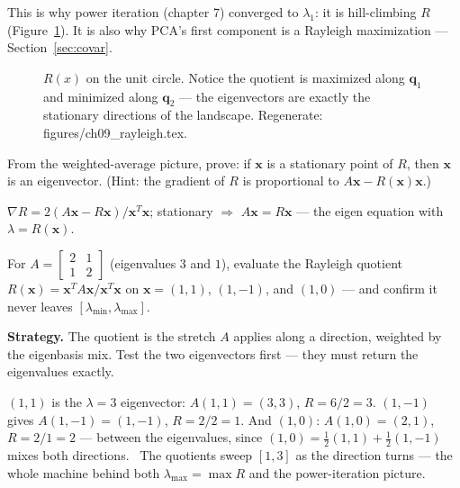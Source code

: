 This is why power iteration (chapter 7) converged to $\lambda_1$: it is
hill-climbing $R$ (Figure~\ref{fig:rayleigh}). It is also why PCA's first
component is a Rayleigh maximization --- Section~\ref{sec:covar}.

\begin{figure}[htbp]
\centering

\caption{$R(x)$ on the unit circle. Notice the quotient is maximized
along $\mathbf q_1$ and minimized along $\mathbf q_2$ --- the
eigenvectors are exactly the stationary directions of the landscape.
Regenerate: \ttfamily figures/ch09\_rayleigh.tex.}
\label{fig:rayleigh}
\end{figure}

\begin{exercise}[hard]
From the weighted-average picture, prove: if $\mathbf x$ is a stationary
point of $R$, then $\mathbf x$ is an eigenvector. (Hint: the gradient of
$R$ is proportional to $A\mathbf x-R(\mathbf x)\mathbf x$.)
\begin{solution}
$\nabla R=2(A\mathbf x-R\mathbf x)/\mathbf x^{T}\mathbf x$; stationary
$\Rightarrow$ $A\mathbf x=R\mathbf x$ --- the eigen equation with
$\lambda=R(\mathbf x)$.
\end{solution}
\end{exercise}

\begin{example}\label{ex:rayq}
For $A=\begin{bmatrix}2&1\\1&2\end{bmatrix}$ (eigenvalues $3$ and $1$),
evaluate the Rayleigh quotient
$R(\mathbf{x})=\mathbf{x}^{T}A\mathbf{x}/\mathbf{x}^{T}\mathbf{x}$ on
$\mathbf{x}=(1,1)$, $(1,-1)$, and $(1,0)$ --- and confirm it never
leaves $[\lambda_{\min},\lambda_{\max}]$.
\par\smallskip
\textbf{Strategy.} The quotient is the stretch $A$ applies along a
direction, weighted by the eigenbasis mix. Test the two eigenvectors
first --- they must return the eigenvalues exactly.
\begin{solution}
$(1,1)$ is the $\lambda=3$ eigenvector: $A(1,1)=(3,3)$,
$R=6/2=3$. $(1,-1)$ gives $A(1,-1)=(1,-1)$, $R=2/2=1$. And
$(1,0)$: $A(1,0)=(2,1)$, $R=2/1=2$ --- between the eigenvalues,
since $(1,0)=\tfrac12(1,1)+\tfrac12(1,-1)$ mixes both directions.
\checkmark\ The quotients sweep $[1,3]$ as the direction turns ---
the whole machine behind both $\lambda_{\max}=\max R$ and the
power-iteration picture.
\end{solution}
\end{example}

